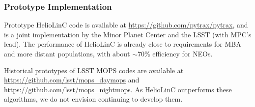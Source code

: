 \subsubsection{Prototype Implementation}

Prototype HelioLinC code is available at \url{https://github.com/pytrax/pytrax}, and is a joint implementation by the Minor Planet Center and the LSST (with MPC's lead). The performance of HelioLinC is already close to requirements for MBA and more distant populations, with about $\sim70$\% efficiency for NEOs.

Historical prototypes of LSST MOPS codes are available at \url{https://github.com/lsst/mops_daymops} and \url{https://github.com/lsst/mops_nightmops}. As HelioLinC outperforms these algorithms, we do not envision continuing to develop them.
